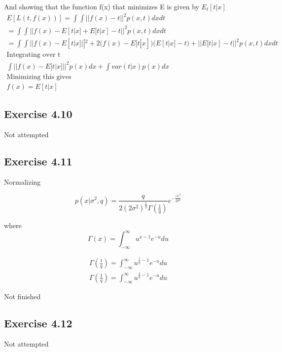 And showing that the function f(x) that minimizes E is given by $E_t[t|x]$
\begin{gather}
  E[L(t,f(x))] = \int \int ||f(x) - t||^2 p(x,t)dxdt \\
  = \int \int ||f(x) -E[t|x] + E[t|x] - t||^2 p(x,t)dxdt \\
  = \int \int ||f(x) - E[t|x]||^2 + 2(f(x)-E[t|x])(E[t|x]-t) + ||E[t|x] - t||^2 p(x,t)dxdt \\
  \text{Integrating over t} \\
  \int ||f(x) - E[t|x]||^2 p(x)dx + \int var(t|x) p(x) dx \\ 
  \text{Minimizing this gives} \\
  f(x) = E[t|x]
\end{gather}

\subsection{Exercise 4.10}
Not attempted

\subsection{Exercise 4.11}
Normalizing

\begin{equation}
  p(x|\sigma^2, q) = \frac{q}{2(2\sigma^2)^\frac{1}{q} \Gamma(\frac{1}{q})} e^{-\frac{|x|^q}{2\sigma^2}}
\end{equation}

where
\begin{equation}
  \Gamma(x) = \int_{-\infty}^{\infty}u^{x-1}e^{-u}du
\end{equation}

\begin{gather}
  \Gamma(\frac{1}{q}) = \int_{-\infty}^{\infty}u^{\frac{1}{q}-1}e^{-u}du \\
  \Gamma(\frac{1}{q}) = \int_{-\infty}^{\infty}u^{\frac{1}{q}-1}e^{-u}du
\end{gather}

Not finished

\subsection{Exercise 4.12}
Not attempted

